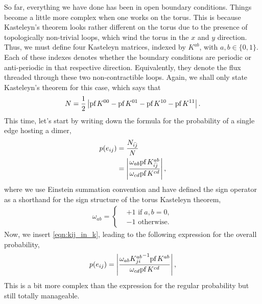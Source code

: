\documentclass[11pt, oneside]{article} %
\numberwithin{equation}{section}
\begin{document}
So far, everything we have done has been in open boundary conditions. Things become a little more complex when one works on the torus. This is because Kasteleyn's theorem looks rather different on the torus due to the presence of topologically non-trivial loops, which wind the torus in the $x$ and $y$ direction. Thus, we must define four Kasteleyn matrices, indexed by $K^{ab}$, with $a,b \in \{0,1\}$. Each of these indexes denotes whether the boundary conditions are periodic or anti-periodic in that respective direction. Equivalently, they denote the flux threaded through these two non-contractible loops. Again, we shall only state Kasteleyn's theorem for this case, which says that
\begin{align}
    N = \frac 12 \left |  \textup{pf}\, K^{00} -\textup{pf}\, K^{01}-\textup{pf}\, K^{10}-\textup{pf}\, K^{11} \right |.
\end{align}
This time, let's start by writing down the formula for the probability of a single edge hosting a dimer,
\begin{align}
    p(e_{ij}) &= \frac{N_{\bar{ij}}}{N} \\ 
    & = \left |
    \frac
    {\omega_{ab}\textup{pf}\, K_{\bar{ij}}^{ab}}
    {\omega_{cd}\textup{pf}\, K^{cd}}
    \right |,
\end{align}
where we use Einstein summation convention and have defined the sign operator as a shorthand for the sign structure of the torus Kasteleyn theorem,
\begin{align}
    \omega_{ab} = \begin{cases}
        & +1 \text{ if}\;a,b=0, \\
        & -1 \text{ otherwise}.
        \end{cases}
\end{align}
Now, we insert \cref{eqn:kij_in_k}, leading to the following expression for the overall probability,
\begin{align}
    p(e_{ij}) = \left |
    \frac
    {
        \omega_{ab}
        {K_{ji}^{ab}}^{-1}
        \textup{pf}\, K^{ab}  
    }
    {
        \omega_{cd}\textup{pf}\, K^{cd}
    }
    \right |,
\end{align}
This is a bit more complex than the expression for the regular probability but still totally manageable.
\end{document}
